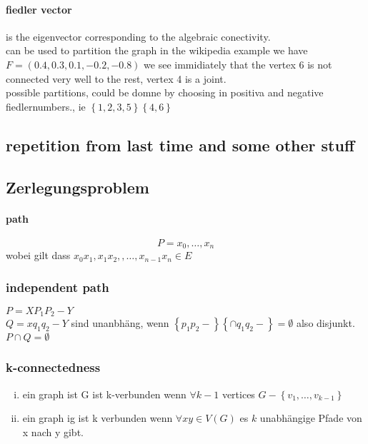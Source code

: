\documentclass[a4paper]{article}
\theoremstyle{definition}
\theoremstyle{remark}
\begin{document}
\paragraph{fiedler vector}
\label{par:fiedler_vector}

is the eigenvector corresponding to the algebraic conectivity.\\
can be used to partition the graph
in the wikipedia example we have $F=(0.4,0.3,0.1,-0.2,-0.8)$
we see immidiately that the vertex 6 is not connected very well to the rest, vertex 4 is a joint.\\
possible partitions, could be domne by choosing in positiva and negative fiedlernumbers., ie $\left\{ 1,2,3,5 \right\}\left\{ 4,6 \right\}$
\subsection{repetition from last time and some other stuff}
\label{sub:repetition_from_last_time_and_some_other_stuff}


\subsection{Zerlegungsproblem}
\label{sub:zerlegungsproblem}

\paragraph{path}
\label{par:path}

\begin{equation}
  P=x_0,\dots,x_n
\end{equation}
wobei gilt dass $x_0x_1,x_1x_2,,\dots,x_{n-1}x_n\in E$
\subsubsection{independent path}
\label{ssub:independent_path}

$P=XP_1P_2-Y$\\
$Q=xq_1q_2-Y$ sind unanbhäng, wenn $ \left\{ p_1p_2- \right\}\left\{\cap q_1q_2- \right\}= \emptyset$ also disjunkt.\\
$P\cap Q= \emptyset$
\subsubsection{k-connectedness}
\label{ssub:k_connectedness}

	\begin{enumerate}[(i)]
	  \item ein graph ist G ist k-verbunden wenn $\forall k-1$ vertices $G-\left\{ v_1,\dots,v_{k-1} \right\}$
	  \item ein graph ig ist k verbunden wenn $\forall xy \in V(G)$ es $k$ unabhängige Pfade von x nach y gibt.
	\end{enumerate}
\end{document}
